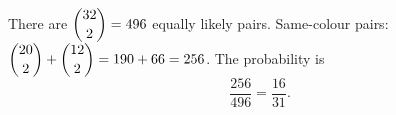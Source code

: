 There are $\dbinom{32}{2}=496$ equally likely pairs. Same-colour pairs: $\dbinom{20}{2}+\dbinom{12}{2}=190+66=256$. The probability is
\[
\dfrac{256}{496}=\boxed{\dfrac{16}{31}}.
\]
